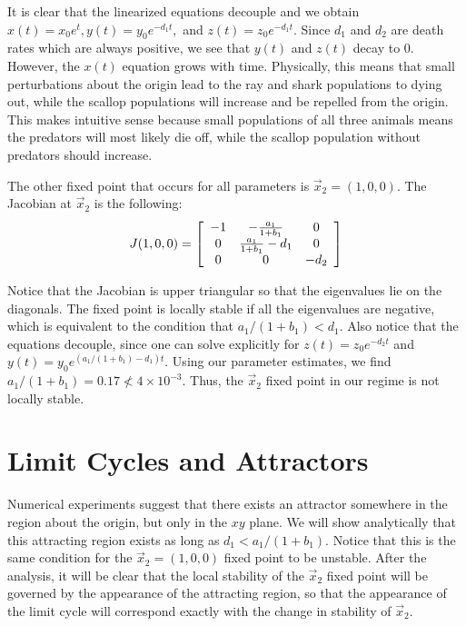 \documentclass{article}
\begin{document}
It is clear that the linearized equations decouple and we obtain $x(t) = x_0 e^t, y(t) = y_0 e^{-d_1 t},$ and $ z(t) = z_0 e^{-d_1 t}$. Since $d_1$ and $d_2$ are death rates which are always positive, we see that $y(t)$ and $z(t)$ decay to 0. However, the $x(t)$ equation grows with time. Physically, this means that small perturbations about the origin lead to the ray and shark populations to dying out, while the scallop populations will increase and be repelled from the origin. This makes intuitive sense because small populations of all three animals means the predators will most likely die off, while the scallop population without predators should increase. 

The other fixed point that occurs for all parameters is $\vec{x}_2 = (1,0,0)$. The Jacobian at $\vec{x}_2$ is the following:
\begin{equation}
J(1,0,0) = \left[ \begin{array}{ c c c}
-1 & -\frac{a_1}{1 + b_1} & 0 \\
0 & \frac{a_1}{1 + b_1} - d_1 & 0 \\
0 & 0 & -d_2 
\end{array} \right]
\end{equation}

Notice that the Jacobian is upper triangular so that the eigenvalues lie on the diagonals. The fixed point is locally stable if all the eigenvalues are negative, which is equivalent to the condition that $a_1/(1 + b_1) < d_1$.  Also notice that the equations decouple, since one can solve explicitly for $z(t) = z_0 e^{-d_2 t}$ and $y(t) = y_0 e^{(a_1/(1 + b_1) - d_1) t}$. Using our parameter estimates, we find $a_1 / (1 + b_1) = 0.17 \not < 4 \times 10^{-3}$. Thus, the $\vec{x}_2$ fixed point in our regime is not locally stable. 

\section{Limit Cycles and Attractors}

Numerical experiments suggest that there exists an attractor somewhere in the region about the origin, but only in the $xy$ plane. We will show analytically that this attracting region exists as long as $d_1 < a_1 / (1 + b_1)$. Notice that this is the same condition for the $\vec{x}_2 = (1,0,0)$ fixed point to be unstable. After the analysis, it will be clear that the local stability of the $\vec{x}_2$ fixed point will be governed by the appearance of the attracting region, so that the appearance of the limit cycle will correspond exactly with the change in stability of $\vec{x}_2$. 
\end{document}

